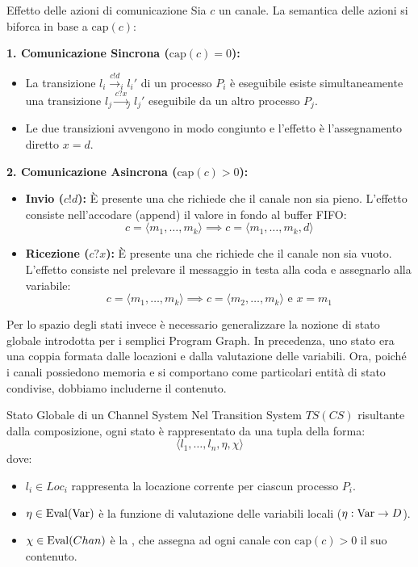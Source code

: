 \begin{definition}{Effetto delle azioni di comunicazione}
  Sia \(c\) un canale. La semantica delle azioni si biforca in base a \(\text{cap}(c)\):

  \textbf{1. Comunicazione Sincrona (\(\text{cap}(c) = 0\)):}
  \begin{itemize}
    \item La transizione \(l_i \xrightarrow{c!d}_i l_i'\) di un processo \(P_i\) è eseguibile  esiste simultaneamente una transizione \(l_j \xrightarrow{c?x}_j l_j'\) eseguibile da un altro processo \(P_j\).
    \item Le due transizioni avvengono in modo congiunto e l'effetto è l'assegnamento diretto \(x = d\).
  \end{itemize}

  \textbf{2. Comunicazione Asincrona (\(\text{cap}(c) > 0\)):}
  \begin{itemize}
    \item \textbf{Invio (\(c!d\)):} È presente una  che richiede che il canale non sia pieno. L'effetto consiste nell'accodare (append) il valore in fondo al buffer FIFO\@:
          \[c = \langle m_1, \dots, m_k \rangle \implies c = \langle m_1, \dots, m_k, d \rangle\]
    \item \textbf{Ricezione (\(c?x\)):} È presente una  che richiede che il canale non sia vuoto. L'effetto consiste nel prelevare il messaggio in testa alla coda e assegnarlo alla variabile:
          \[c = \langle m_1, \dots, m_k \rangle \implies c = \langle m_2, \dots, m_k \rangle \text{ e } x = m_1\]
  \end{itemize}
\end{definition}

Per lo spazio degli stati invece è necessario generalizzare la nozione di stato globale introdotta per i semplici Program Graph. In precedenza, uno stato era una coppia formata dalle locazioni e dalla valutazione delle variabili. Ora, poiché i canali possiedono memoria e si comportano come particolari entità di stato condivise, dobbiamo includerne il contenuto.

\begin{definition}{Stato Globale di un Channel System}
  Nel Transition System \(TS(CS)\) risultante dalla composizione, ogni stato è rappresentato da una tupla della forma:
  \[\langle l_1, \dots, l_n, \eta, \chi \rangle\]
  dove:
  \begin{itemize}
    \item \(l_i \in Loc_i\) rappresenta la locazione corrente per ciascun processo \(P_i\).
    \item \(\eta \in \operatorname{Eval}(\operatorname{Var})\) è la funzione di valutazione delle variabili locali (\(\eta: \operatorname{Var} \to D\)).
    \item \(\chi \in \operatorname{Eval}(Chan)\) è la , che assegna ad ogni canale con \(\text{cap}(c) > 0\) il suo contenuto. 
  \end{itemize}
\end{definition}

